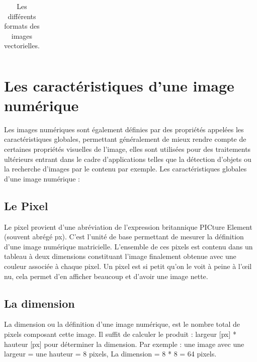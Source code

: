 \begin{table}[H]
\begin{tabular}{|l|l|l|l|}
	\end{tabular}
	\caption{Les différents formats des images vectorielles.}
\end{table}

\section{Les caractéristiques d’une image numérique}
Les images numériques sont également définies par des propriétés appelées les caractéristiques globales, permettant généralement de mieux rendre compte de certaines propriétés visuelles de l'image, elles sont utilisées pour des traitements ultérieurs entrant dans le cadre d'applications telles que la détection d'objets ou la recherche d'images par le contenu par exemple.
Les caractéristiques globales d’une image numérique :

\subsection{Le Pixel}
Le pixel provient d’une abréviation de l’expression britannique PICture
Element (souvent abrégé px). C’est l'unité de base permettant de mesurer la
définition d'une image numérique matricielle.
L'ensemble de ces pixels est contenu dans un tableau à deux dimensions
constituant l'image finalement obtenue avec une couleur associée à chaque
pixel. Un pixel est si petit qu'on le voit à peine à l'œil nu, cela permet d'en
afficher beaucoup et d'avoir une image nette.

\subsection{La dimension}
La dimension ou la définition d’une image numérique, est le nombre total de pixels composant cette image. Il suffit de calculer le produit : largeur [px] * hauteur [px] pour déterminer la dimension. Par exemple : une image
avec une largeur = une hauteur = 8 pixels, La dimension = 8 * 8 = 64 pixels.

